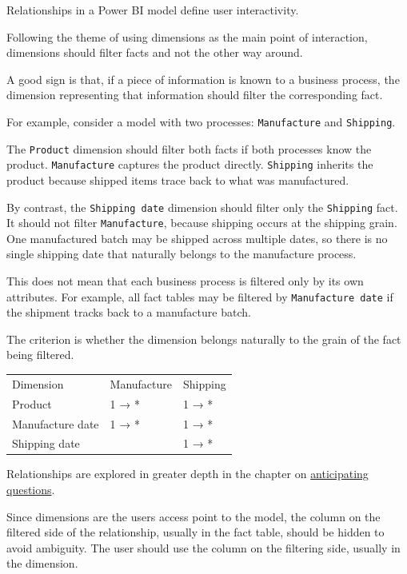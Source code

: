 \documentclass[10pt,openany,10pt]{book}
\newcounter{none}
\let\podeToprule\toprule
\let\podeMidrule\midrule
\let\podeBottomrule\bottomrule
\renewcommand{\toprule}{\arrayrulecolor{pbiGrid}\podeToprule}
\renewcommand{\midrule}{\arrayrulecolor{pbiGrid}\podeMidrule}
\renewcommand{\bottomrule}{\arrayrulecolor{pbiGrid}\podeBottomrule}
\begin{document}
Relationships in a Power BI model define user interactivity.

Following the theme of using dimensions as the main point of
interaction, dimensions should filter facts and not the other way
around.

A good sign is that, if a piece of information is known to a business
process, the dimension representing that information should filter the
corresponding fact.

For example, consider a model with two processes: \texttt{Manufacture}
and \texttt{Shipping}.

The \texttt{Product} dimension should filter both facts if both
processes know the product. \texttt{Manufacture} captures the product
directly. \texttt{Shipping} inherits the product because shipped items
trace back to what was manufactured.

By contrast, the \texttt{Shipping\ date} dimension should filter only
the \texttt{Shipping} fact. It should not filter \texttt{Manufacture},
because shipping occurs at the shipping grain. One manufactured batch
may be shipped across multiple dates, so there is no single shipping
date that naturally belongs to the manufacture process.

This does not mean that each business process is filtered only by its
own attributes. For example, all fact tables may be filtered by
\texttt{Manufacture\ date} if the shipment tracks back to a manufacture
batch.

The criterion is whether the dimension belongs naturally to the grain of
the fact being filtered.

{\def\LTcaptype{none} %
\begin{longtable}[]{@{}lll@{}}
\toprule\noalign{}
Dimension & Manufacture & Shipping \\
\midrule\noalign{}
\endhead
\bottomrule\noalign{}
\endlastfoot
Product & 1 → * & 1 → * \\
Manufacture date & 1 → * & 1 → * \\
Shipping date & & 1 → * \\
\end{longtable}
}

Relationships are explored in greater depth in the chapter on
\hyperref[docs-presenting-insights-anticipating-questions]{anticipating
questions}.

Since dimensions are the user\textquotesingle s access point to the
model, the column on the filtered side of the relationship, usually in
the fact table, should be hidden to avoid ambiguity. The user should use
the column on the filtering side, usually in the dimension.
\end{document}
